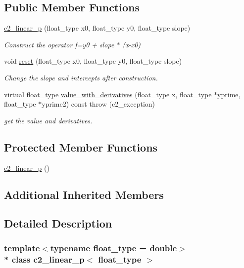 \subsection*{Public Member Functions}
\begin{DoxyCompactItemize}
\item 
\hyperlink{classc2__linear__p_a6a76eba066b8f52636fd4b6cc7307b06}{c2\+\_\+linear\+\_\+p} (float\+\_\+type x0, float\+\_\+type y0, float\+\_\+type slope)
\begin{DoxyCompactList}\small\item\em Construct the operator f=y0 + slope $\ast$ (x-\/x0) \end{DoxyCompactList}\item 
void \hyperlink{classc2__linear__p_ada2849448ebb2b5b493f45a2db6ab908}{reset} (float\+\_\+type x0, float\+\_\+type y0, float\+\_\+type slope)
\begin{DoxyCompactList}\small\item\em Change the slope and intercepts after construction. \end{DoxyCompactList}\item 
virtual float\+\_\+type \hyperlink{classc2__linear__p_a1d6ce127c8e991c4293f530f341ce617}{value\+\_\+with\+\_\+derivatives} (float\+\_\+type x, float\+\_\+type $\ast$yprime, float\+\_\+type $\ast$yprime2) const   throw (c2\+\_\+exception)
\begin{DoxyCompactList}\small\item\em get the value and derivatives. \end{DoxyCompactList}\end{DoxyCompactItemize}
\subsection*{Protected Member Functions}
\begin{DoxyCompactItemize}
\item 
\hyperlink{classc2__linear__p_a33aafddd6c217e41aab925bee699a0eb}{c2\+\_\+linear\+\_\+p} ()
\end{DoxyCompactItemize}
\subsection*{Additional Inherited Members}


\subsection{Detailed Description}
\subsubsection*{template$<$typename float\+\_\+type = double$>$\\*
class c2\+\_\+linear\+\_\+p$<$ float\+\_\+type $>$}

